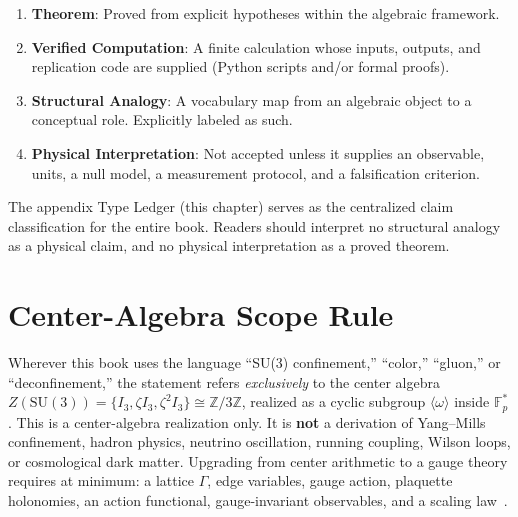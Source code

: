 \documentclass[12pt,oneside]{book}
\theoremstyle{principia}
\theoremstyle{definition}
\theoremstyle{remark}
\providecommand{\ZZ}{\mathbb{Z}}
\providecommand{\FF}{\mathbb{F}}
\begin{document}
\begin{enumerate}[noitemsep]
\item \textbf{Theorem}: Proved from explicit hypotheses within the algebraic framework.
\item \textbf{Verified Computation}: A finite calculation whose inputs, outputs, and replication code are supplied (Python scripts and/or formal proofs).
\item \textbf{Structural Analogy}: A vocabulary map from an algebraic object to a conceptual role. Explicitly labeled as such.
\item \textbf{Physical Interpretation}: Not accepted unless it supplies an observable, units, a null model, a measurement protocol, and a falsification criterion.
\end{enumerate}

\noindent The appendix Type Ledger (this chapter) serves as the centralized claim classification for the entire book. Readers should interpret no structural analogy as a physical claim, and no physical interpretation as a proved theorem.

\section{Center-Algebra Scope Rule}
Wherever this book uses the language ``SU(3) confinement,'' ``color,'' ``gluon,'' or ``deconfinement,'' the statement refers \emph{exclusively} to the center algebra $Z(\mathrm{SU}(3)) = \{I_3, \zeta I_3, \zeta^2 I_3\} \cong \ZZ/3\ZZ$, realized as a cyclic subgroup $\langle\omega\rangle$ inside $\FF_p^*$. This is a center-algebra realization only. It is \textbf{not} a derivation of Yang--Mills confinement, hadron physics, neutrino oscillation, running coupling, Wilson loops, or cosmological dark matter. Upgrading from center arithmetic to a gauge theory requires at minimum: a lattice $\Gamma$, edge variables, gauge action, plaquette holonomies, an action functional, gauge-invariant observables, and a scaling law~\cite{lockwood_larue_dwm}.
\end{document}
